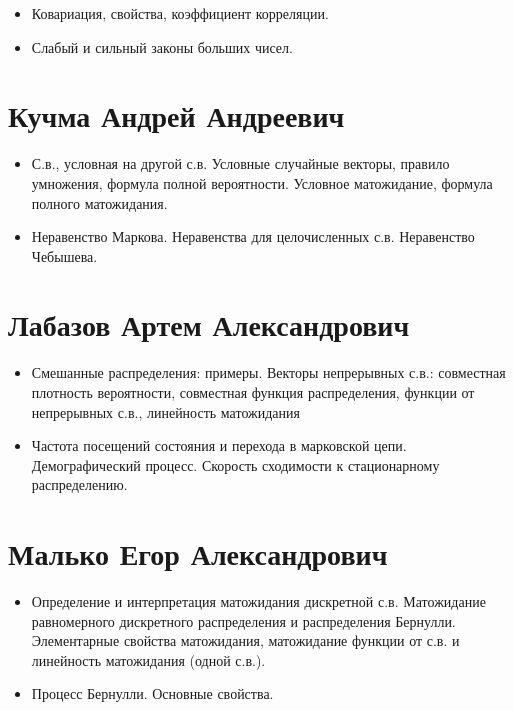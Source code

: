 \documentclass[12pt]{article}
\begin{document}
\begin{itemize}
  \item Ковариация, свойства, коэффициент корреляции.
  \item Слабый и сильный законы больших чисел.
\end{itemize}

\section{Кучма Андрей Андреевич}

\begin{itemize}
  \item С.в., условная на другой с.в. Условные случайные векторы, правило умножения, формула полной вероятности. Условное матожидание, формула полного матожидания.
  \item Неравенство Маркова. Неравенства для целочисленных с.в. Неравенство Чебышева.
\end{itemize}

\section{Лабазов Артем Александрович}

\begin{itemize}
  \item Смешанные распределения: примеры. Векторы непрерывных с.в.: совместная плотность вероятности, совместная функция распределения, функции от непрерывных с.в., линейность матожидания
  \item Частота посещений состояния и перехода в марковской цепи. Демографический процесс. Скорость сходимости к стационарному распределению.
\end{itemize}

\section{Малько Егор Александрович}

\begin{itemize}
  \item Определение и интерпретация матожидания дискретной с.в. Матожидание равномерного дискретного распределения и распределения Бернулли. Элементарные свойства матожидания, матожидание функции от с.в. и линейность матожидания (одной с.в.).
  \item Процесс Бернулли. Основные свойства.
\end{itemize}
\end{document}
